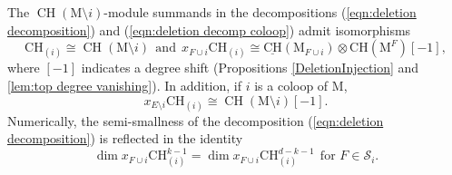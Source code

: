 \documentclass[11pt,reqno]{amsart}
\theoremstyle{definition}
\theoremstyle{remark}
\renewcommand{\dim}{\operatorname{dim}}
\renewcommand{\(}{\left(}
\renewcommand{\)}{\right)}
\newcommand{\<}{\left<}
\renewcommand{\>}{\right>}
\newcommand{\CH}{\operatorname{CH}}
\begin{document}
The  $\CH(\mathrm{M} \setminus i)$-module summands in the decompositions  (\ref{eqn:deletion decomposition})  and  (\ref{eqn:deletion decomp coloop}) admit isomorphisms 
\[
\mathrm{CH}_{(i)} \cong \CH(\mathrm{M} \setminus i) \ \  \text{and} \ \ 
 x_{F\cup i}\mathrm{CH}_{(i)} \cong \underline{\mathrm{CH}}(\mathrm{M}_{F\cup i}) \otimes  \mathrm{CH}(\mathrm{M}^{F})[-1], %
\]
where $[-1]$ indicates a degree shift (Propositions \ref{DeletionInjection} and \ref{lem:top degree vanishing}).
In addition, if $i$ is a coloop of $\mathrm{M}$, 
\[
x_{E \setminus i}\mathrm{CH}_{(i)} \cong \CH(\mathrm{M} \setminus i)[-1].
\]
Numerically, the semi-smallness of the decomposition (\ref{eqn:deletion decomposition})  %
is reflected in the identity
\[
\dim  x_{F\cup i}\mathrm{CH}^{k-1}_{(i)}  = \dim  x_{F\cup i}\mathrm{CH}_{(i)}^{d-k-1}\ \ \text{for $F \in \mathscr{S}_i$}.
\]

\end{document}
